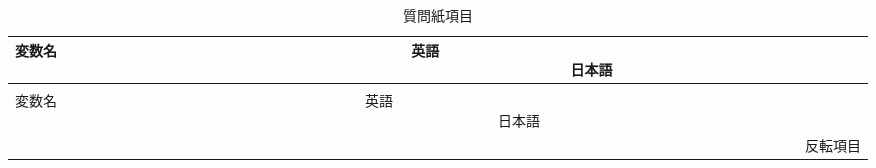 \documentclass[a4j,12pt]{jreport}
\begin{document}
\begin{center}
{\scriptsize


\begin{longtable}{lp{5cm}p{5cm}}
\caption{質問紙項目}
\label{table:items}
\\\hline
\multicolumn{3}{l}{変数名~~~~~~~~~~~~~~~~~~~~~~~~~~~~~~~~~~~~~~~~~~~~英語  ~~~~~~~~~~~~~~~~~~~~~~~~~~~~~~~~~~~~~~~~~~~~~~~~~~~~~~~~~~~~~~~~~~~~~日本語}\\
\hline \endfirsthead

\\\hline
\multicolumn{3}{l}{変数名~~~~~~~~~~~~~~~~~~~~~~~~~~~~~~~~~~~~~~~~~~~~英語  ~~~~~~~~~~~~~~~~~~~~~~~~~~~~~~~~~~~~~~~~~~~~~~~~~~~~~~~~~~~~~~~~~~~~~日本語}\\
\hline \endhead

\hline
\multicolumn{3}{r}{\scriptsize *反転項目}
\endfoot


\end{longtable}}
\end{center}
\end{document}
